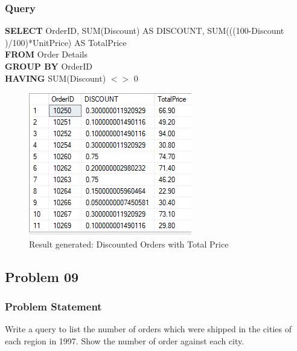 \documentclass[12pt,a4paper]{report}
\begin{document}
\subsubsection{Query}
\begin{center}
	\begin{minipage}{15cm}
		\textbf{SELECT} OrderID, SUM(Discount) AS DISCOUNT, SUM(((100-Discount )/100)*UnitPrice) AS TotalPrice\\
		\textbf{FROM} Order Details\\
		\textbf{GROUP BY} OrderID\\
		\textbf{HAVING} SUM(Discount) $<>$ 0
	\end{minipage}
	\begin{figure}[h]
	\centering
		\includegraphics[scale=0.7]{images/13.png}
		\caption{Result generated: Discounted Orders with Total Price}
	\end{figure}
\end{center}

\subsection{Problem 09}
\subsubsection{Problem Statement}
Write a query to list the number of orders which were shipped in the cities of each region in 1997. Show 
the number of order against each city.
\end{document}
